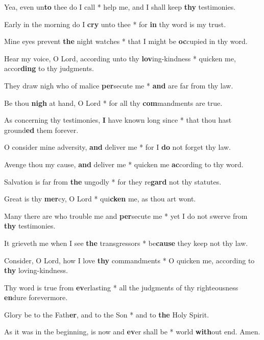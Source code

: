 \begin{multicols}{2}
	Yea, even un\textbf{to} thee do I call * help me, and I shall keep \textbf{thy} testimonies.
	
	Early in the morning do I \textbf{cry} unto thee * for \textbf{in} thy word is my trust.
	
	Mine eyes prevent \textbf{the} night watches * that I might be \textbf{oc}cupied in thy word.
	
	Hear my voice, O Lord, according unto thy \textbf{lov}ing-kindness * quicken me, accor\textbf{ding} to thy judgments.
	
	They draw nigh who of malice \textbf{per}secute me * \textbf{and} are far from thy law.
	
	Be thou \textbf{nigh} at hand, O Lord * for all thy \textbf{com}mandments are true.
	
	As concerning thy testimonies, \textbf{I} have known long since * that thou hast ground\textbf{ed} them forever.
	
	O consider mine adversity, \textbf{and} deliver me * for I \textbf{do} not forget thy law.
	
	Avenge thou my cause, \textbf{and} deliver me * quicken me \textbf{ac}cording to thy word.
	
	Salvation is far from \textbf{the} ungodly * for they re\textbf{gard} not thy statutes.
	
	Great is thy \textbf{mer}cy, O Lord * qui\textbf{cken} me, as thou art wont.
	
	Many there are who trouble me and \textbf{per}secute me * yet I do not swerve from \textbf{thy} testimonies.
	
	It grieveth me when I see \textbf{the} transgressors * be\textbf{cause} they keep not thy law.
	
	Consider, O Lord, how I love \textbf{thy} commandments * O quicken me, according to \textbf{thy} loving-kindness.
	
	Thy word is true from \textbf{ev}erlasting * all the judgments of thy righteousness \textbf{en}dure forevermore.
	
	Glory be to the Fath\textbf{er}, and to the Son * and to \textbf{the} Holy Spirit.
	
	As it was in the beginning, is now and \textbf{ev}er shall be * world \textbf{with}out end. Amen.
\end{multicols}